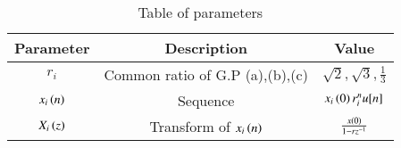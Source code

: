 \begin{table}[ht]
\renewcommand\thetable{1}
\begin{tabular}{|c|c|c|}
    \hline 
    \textbf{Parameter}&\textbf{Description} &\textbf{Value}\\
    \hline 
    $r_i$ & Common ratio of G.P (a),(b),(c) & $\sqrt{2}, \sqrt{3}, \frac{1}{3}$ \\
    \hline 
    $x_i\left(n\right)$ & Sequence & $x_i\left(0\right)r_i^nu[n]$ \\
    \hline 
	$X_i\left(z\right)$ & Transform of $x_i\left(n\right)$ & $\frac{x\left(0\right)}{1-rz^{-1}}$ \\
    \hline
\end{tabular}

\caption{Table of parameters}
\label{Table:1}
\end{table}

